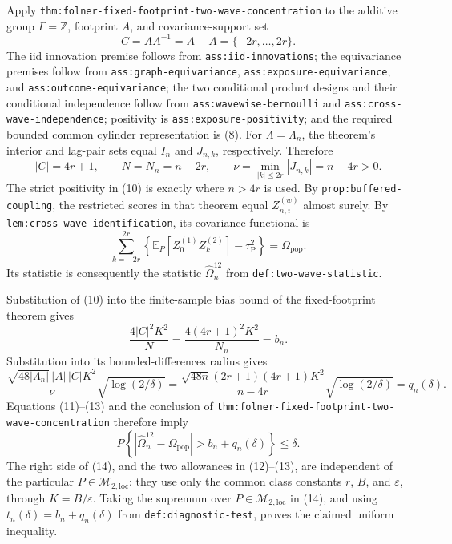 Apply \texttt{thm:folner-fixed-footprint-two-wave-concentration} to the additive group \(\Gamma=\mathbb Z\), footprint \(A\), and covariance-support set
\[
 C=AA^{-1}=A-A=\{-2r,\ldots,2r\}. \tag{9}
\]
The iid innovation premise follows from \texttt{ass:iid-innovations}; the equivariance premises follow from \texttt{ass:graph-equivariance}, \texttt{ass:exposure-equivariance}, and \texttt{ass:outcome-equivariance}; the two conditional product designs and their conditional independence follow from \texttt{ass:wavewise-bernoulli} and \texttt{ass:cross-wave-independence}; positivity is \texttt{ass:exposure-positivity}; and the required bounded common cylinder representation is (8).  For \(\Lambda=\Lambda_n\), the theorem's interior and lag-pair sets equal \(I_n\) and \(J_{n,k}\), respectively.  Therefore
\[
 |C|=4r+1,
 \qquad N=N_n=n-2r,
 \qquad
 \nu=\min_{|k|\le 2r}|J_{n,k}|=n-4r>0. \tag{10}
\]
The strict positivity in (10) is exactly where \(n>4r\) is used.  By \texttt{prop:buffered-coupling}, the restricted scores in that theorem equal \(Z_{n,i}^{(w)}\) almost surely.  By \texttt{lem:cross-wave-identification}, its covariance functional is
\[
 \sum_{k=-2r}^{2r}
 \left\{\mathbb E_P[Z_0^{(1)}Z_k^{(2)}]-\tau_{\mathrm P}^2\right\}
 =\Omega_{\mathrm{pop}}. \tag{11}
\]
Its statistic is consequently the statistic \(\widehat\Omega_n^{12}\) from \texttt{def:two-wave-statistic}.

Substitution of (10) into the finite-sample bias bound of the fixed-footprint theorem gives
\[
 \frac{4|C|^2K^2}{N}
 =\frac{4(4r+1)^2K^2}{N_n}
 =b_n. \tag{12}
\]
Substitution into its bounded-differences radius gives
\[
 \frac{\sqrt{48|\Lambda_n|}\,|A|\,|C|K^2}{\nu}
 \sqrt{\log(2/\delta)}
 =\frac{\sqrt{48n}(2r+1)(4r+1)K^2}{n-4r}
 \sqrt{\log(2/\delta)}
 =q_n(\delta). \tag{13}
\]
Equations (11)--(13) and the conclusion of \texttt{thm:folner-fixed-footprint-two-wave-concentration} therefore imply
\[
 P\!\left\{
  \left|\widehat\Omega_n^{12}-\Omega_{\mathrm{pop}}\right|
  >b_n+q_n(\delta)
 \right\}\le\delta. \tag{14}
\]
The right side of (14), and the two allowances in (12)--(13), are independent of the particular \(P\in\mathcal M_{2,\mathrm{loc}}\): they use only the common class constants \(r\), \(B\), and \(\varepsilon\), through \(K=B/\varepsilon\).  Taking the supremum over \(P\in\mathcal M_{2,\mathrm{loc}}\) in (14), and using \(t_n(\delta)=b_n+q_n(\delta)\) from \texttt{def:diagnostic-test}, proves the claimed uniform inequality.

